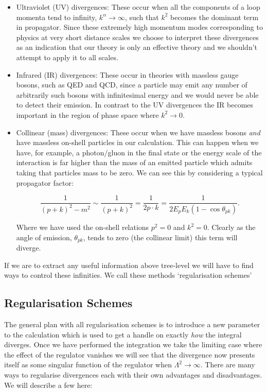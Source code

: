 	\begin{itemize}
		\item Ultraviolet (UV) divergences:  These occur when all the components of a loop momenta tend to
		infinity, $k^\alpha\rightarrow\infty$, such that $k^2$ becomes the dominant term in propagator.
		Since these extremely high momentum modes corresponding to physics at very short distance scales
		we choose to interpret these divergences as an indication that our theory is only an
		effective theory and we shouldn't attempt to apply it to all scales.

		\item Infrared (IR) divergences:  These occur in theories with massless gauge bosons, such as
		QED and QCD, since a particle may emit any number of arbitrarily such bosons with infinitesimal
		energy and we would never be able to detect their emission.  In contrast to the UV divergences
		the IR becomes important in the region of phase space where $k^2\rightarrow0$.

		\item Collinear (mass) divergences: These occur when we have massless bosons \emph{and} have
		massless on-shell particles in our calculation.  This can happen when we have, for example,
		a photon/gluon in the final state or the energy scale of the interaction is far higher than
		the mass of an emitted particle which admits taking that particles mass to be zero.
		We can see this by considering a typical propagator factor:

		\begin{equation}
			\frac{1}{(p+k)^2-m^2}\sim\frac{1}{(p+k)^2} = \frac{1}{2p\cdot k} = \frac{1}{2E_pE_k(1-\cos\theta_{pk})}.
		\end{equation}

		Where we have used the on-shell relations $p^2=0$ and $k^2=0$.  Clearly as the angle of
		emission, $\theta_{pk}$, tends to zero (the collinear limit) this term will diverge.
	\end{itemize}

	If we are to extract any useful information above tree-level we will have to find
	ways to control these infinities.  We call these methods `regularisation schemes'

	\subsection{Regularisation Schemes}

	The general plan with all regularisation schemes is to introduce a new parameter to the calculation which
	is used to get a handle on exactly \emph{how} the integral diverges.  Once we have performed the integration
	we take the limiting case where the effect of the regulator vanishes we will see that the divergence now
	presents itself as some singular function of the regulator when $\Lambda^2\rightarrow\infty$.  There are
	many ways to regularise divergences each with their own advantages and disadvantages.  We will describe a few here:

